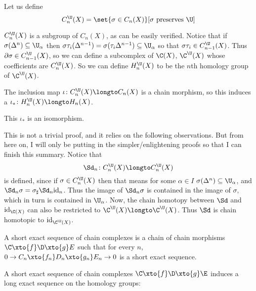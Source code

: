     Let us define
    $$ C_n^\U(X) = \set{\sigma\in C_n(X)}[\sigma\hbox{ preserves $\U$}] $$

\edefn

$C_n^\U(X)$ is a subgroup of $C_n(X)$, as can be easily verified.
Notice that if $\sigma(\Delta^n)\subseteq\U_\alpha$ then $\sigma\tau_i(\Delta^{n-1})=\sigma(\tau_i\Delta^{n-1})\subseteq\U_\alpha$ so that $\sigma\tau_i\in C_{n-1}^\U(X)$.
Thus $\partial\sigma\in C_{n-1}^\U(X)$, so we can define a subcomplex of $\C(X)$, $\C^\U(X)$ whose coefficients are $C_n^\U(X)$.
So we can define $H_n^\U(X)$ to be the $n$th homology group of $\C^\U(X)$.

The inclusion map $\iota\colon C_n^\U(X)\longto C_n(X)$ is a chain morphism, so this induces a $\iota_*\colon H_n^\U(X)\longto H_n(X)$.

\bthrm

    This $\iota_*$ is an isomorphism.

\ethrm

This is not a trivial proof, and it relies on the following observations.
But from here on, I will only be putting in the simpler/enlightening proofs so that I can finish this summary.
Notice that
$$ \Sd_n\colon C_n^\U(X) \longto C_n^\U(X) $$
is defined, since if $\sigma\in C_n^\U(X)$ then that means for some $\alpha\in I$ $\sigma(\Delta^n)\subseteq\U_\alpha$, and $\Sd_n\sigma=\sigma_\sharp\Sd_n{\rm id}_n$.
Thus the image of $\Sd_n\sigma$ is contained in the image of $\sigma$, which in turn is contained in $\U_\alpha$.
Now, the chain homotopy between $\Sd$ and ${\rm id}_{\C(X)}$ can also be restricted to $\C^\U(X)\longto\C^\U(X)$.
Thus $\Sd$ is chain homotopic to ${\rm id}_{\C^\U(X)}$.

\bdefn

    A {\emphcolor short exact sequence} of chain complexes is a chain of chain morphisms $\C\xto{f}\D\xto{g}E$ such that for every $n$, $0\to C_n\xto{f_n}D_n\xto{g_n}E_n\to0$ is a short exact sequence.

\edefn

\blemm

    A short exact sequence of chain complexes $\C\xto{f}\D\xto{g}\E$ induces a long exact sequence on the homology groups:

    \centerline{}

